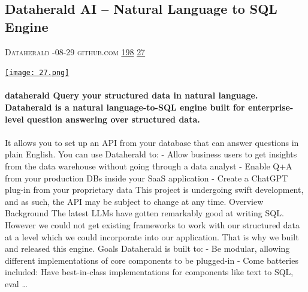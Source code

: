 \documentclass[10pt,a4paper]{article}
\begin{document}
\begin{multicols}{2}
\raggedcolumns
\noindent\begin{minipage}{\linewidth}
\medskip
\subsection{Dataherald AI – Natural Language to SQL Engine}
\textsc{\footnotesize
{\scriptsize\faUser}\space 
Dataherald 
{\scriptsize\faCalendar}-08-29 
{\scriptsize\faGithub}\space 
github.com 
{\scriptsize\faThumbsOUp}\space 
\href{http://news.ycombinator.com/item?id=37240363\&utm\_term=comment}{198} 
{\scriptsize\faComments}\space 
\href{http://news.ycombinator.com/item?id=37240363\&utm\_term=comment}{27} 
}
\par\medskip\noindent
\href{https://github.com/Dataherald/dataherald?utm\_source=hackernewsletter\&utm\_medium=email\&utm\_term=data}{
    \texttt{[image: 27.png]}
}
\end{minipage}
\paragraph{}
\textbf{dataherald
Query your structured data in natural language.
Dataherald is a natural language-to-SQL engine built for enterprise-level question answering over structured data.}
\paragraph{}
 It allows you to set up an API from your database that can answer questions in plain English. You can use Dataherald to:
- Allow business users to get insights from the data warehouse without going through a data analyst
- Enable Q+A from your production DBs inside your SaaS application
- Create a ChatGPT plug-in from your proprietary data
This project is undergoing swift development, and as such, the API may be subject to change at any time.
Overview
Background
The latest LLMs have gotten remarkably good at writing SQL. However we could not get existing frameworks to work with our structured data at a level which we could incorporate into our application. That is why we built and released this engine.
Goals
Dataherald is built to:
- Be modular, allowing different implementations of core components to be plugged-in
- Come batteries included: Have best-in-class implementations for components like text to SQL, eval
\dots\par
\noindent\begin{minipage}{\linewidth}
\medskip

\end{minipage}
\end{multicols}
\end{document}
